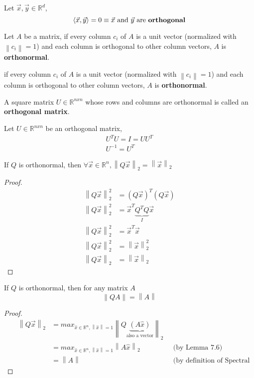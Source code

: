 \documentclass[12pt]{article}
\newcommand{\norm}[1]{\left\lVert#1\right\rVert}
\begin{document}
\begin{definition}
Let $\vec{x}, \vec{y} \in \mathbb{R}^d$,
$$\langle \vec{x}, \vec{y} \rangle = 0 \equiv \text{$\vec{x}$ and $\vec{y}$ are \textbf{orthogonal}}$$
\end{definition}

\begin{definition}
Let $A$ be a matrix,
if every column $c_i$ of $A$ is a unit vector (normalized with $\norm{c_i} = 1$) and each column is orthogonal to other column vectors, $A$ is \textbf{orthonormal}.
\end{definition}

\begin{definition}
if every column $c_i$ of $A$ is a unit vector (normalized with $\norm{c_i} = 1$) and each column is orthogonal to other column vectors, $A$ is \textbf{orthonormal}.
\end{definition}

\begin{definition}
A square matrix $U \in \mathbb{R}^{nxn}$ whose rows and columns are orthonormal is called an \textbf{orthogonal matrix}.
\end{definition}

\begin{fact}
Let $U \in \mathbb{R}^{nxn}$ be an orthogonal matrix,
\begin{align}
    U^TU = I = UU^T\\
    U^{-1} = U^T
\end{align}
\end{fact}

\begin{lemma}
If $Q$ is orthonormal, then $\forall \vec{x} \in \mathbb{R}^n, \norm{Q\vec{x}}_2 = \norm{\vec{x}}_2$
\end{lemma}
\begin{proof}
\begin{align*}
    \norm{Q\vec{x}}_2^2 &= (Q\vec{x})^T(Q\vec{x}) \\                
    \norm{Q\vec{x}}_2^2 &= \vec{x}^T\underbrace{Q^TQ}_{I}\vec{x} \\
    \norm{Q\vec{x}}_2^2 &= \vec{x}^T\vec{x} \\
    \norm{Q\vec{x}}_2^2 &= \norm{\vec{x}}_2^2 \\
    \norm{Q\vec{x}}_2 &= \norm{\vec{x}}_2
\end{align*}
\end{proof}
\begin{lemma}
If $Q$ is orthonormal, then for any matrix $A$
$$\norm{QA} = \norm{A}$$
\end{lemma}
\begin{proof}
\begin{align*}
    && \norm{Q\vec{x}}_2 &= max_{\hat{x} \in \mathbb{R}^n, \norm{\hat{x}} = 1} \norm{Q\underbrace{(A\hat{x})}_{\text{also a vector}}}_2 && \\                
    &&                  &= max_{\hat{x} \in \mathbb{R}^n, \norm{\hat{x}} = 1} \norm{A\hat{x}}_2 && \text{(by Lemma 7.6)} \\
    && &= \norm{A} && \text{(by definition of Spectral norm)}
\end{align*}
\end{proof}
\end{document}
